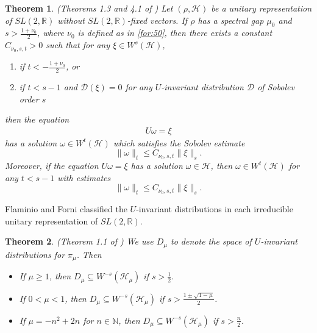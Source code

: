 \documentclass[11 pt]{amsart}
\newcommand{\NN}{\mathbb{N}}
\newcommand{\RR}{\mathbb{R}}
\newtheorem{theorem}{Theorem}[section]
\theoremstyle{definition}
\numberwithin{equation}{section}
\begin{document}
\begin{theorem}\label{th:5} (Theorems 1.3 and 4.1 of \cite{Forni}) Let $(\rho,\mathcal{H})$ be a unitary representation of $SL(2,\RR)$ without $SL(2,\RR)$-fixed vectors. If $\rho$ has a spectral gap $\mu_0$ and $s > \frac{1 + \nu_0}{2}$, where $\nu_0$ is defined as in \eqref{for:50}, then there exists a constant $C_{\nu_0,s,t}>0$ such that for any $\xi\in W^s(\mathcal{H})$,
\begin{enumerate}
  \item\label{for:68} if $t<-\frac{1 + \nu_0}{2}$, or

  \smallskip
  \item\label{for:217} if \( t < s - 1 \) and \( \mathcal{D}(\xi) = 0 \) for any $U$-invariant distribution $\mathcal{D}$ of Sobolev order $s$
\end{enumerate}
then the equation
\begin{align*}
  U\omega=\xi
\end{align*}
has a solution $\omega\in W^t(\mathcal{H})$ which satisfies the Sobolev estimate
\[
\| \omega \|_t \leq C_{\nu_0,s,t} \| \xi \|_s.
\]
Moreover, if the equation $U\omega=\xi$
has a solution $\omega\in \mathcal{H}$, then $\omega\in W^t(\mathcal{H})$ for any \( t < s - 1 \) with estimates
\[
\| \omega \|_t \leq C_{\nu_0,s,t} \| \xi \|_s.
\]
\end{theorem}
Flaminio and Forni classified the $U$-invariant distributions in each irreducible unitary representation of $SL(2,\RR)$.
\begin{theorem}\label{th:18} (Theorem 1.1 of \cite{Forni}) We use $D_\mu$ to denote the space of $U$-invariant distributions for $\pi_\mu$. Then
\begin{itemize}
  \item If $\mu \geq 1$, then $D_\mu\subseteq W^{-s}(\mathcal{H}_\mu)$ if $s>\frac{1}{2}$.
\smallskip
  \item If $0 < \mu < 1$, then $D_\mu\subseteq W^{-s}(\mathcal{H}_\mu)$ if $s>\frac{1\pm\sqrt{1 - \mu}}{2}$.
  \smallskip
  \item If $\mu=-n^2+2n$ for $n\in\NN$, then $D_\mu\subseteq W^{-s}(\mathcal{H}_\mu)$ if $s>\frac{n}{2}$.

\end{itemize}
\end{theorem}
\end{document}
